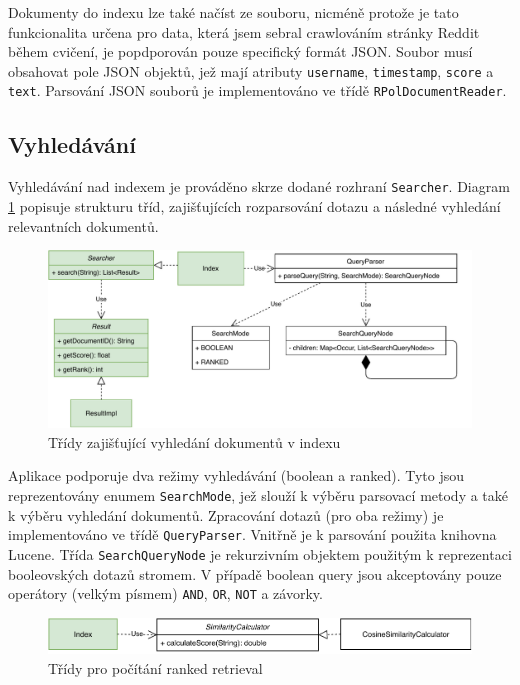 \documentclass[11pt,a4paper]{scrartcl}
\begin{document}
	Dokumenty do indexu lze také načíst ze souboru, nicméně protože je tato funkcionalita určena pro data, která jsem sebral crawlováním stránky Reddit během cvičení, je popdporován pouze specifický formát JSON. Soubor musí obsahovat pole JSON objektů, jež mají atributy \verb|username|, \verb|timestamp|, \verb|score| a \verb|text|. Parsování JSON souborů je implementováno ve třídě \verb|RPolDocumentReader|.
	
	\subsection{Vyhledávání}
	
	Vyhledávání nad indexem je prováděno skrze dodané rozhraní \verb|Searcher|. Diagram \ref{fig:search-uml} popisuje strukturu tříd, zajišťujících rozparsování dotazu a následné vyhledání relevantních dokumentů.
	
	\begin{figure}[!h]
		\centering
		\includegraphics[width=\linewidth]{search-uml}
		\caption{Třídy zajišťující vyhledání dokumentů v indexu}
		\label{fig:search-uml}
	\end{figure} 
	
	Aplikace podporuje dva režimy vyhledávání (boolean a ranked). Tyto jsou reprezentovány enumem \verb|SearchMode|, jež slouží k výběru parsovací metody a také k výběru vyhledání dokumentů. Zpracování dotazů (pro oba režimy) je implementováno ve třídě \verb|QueryParser|. Vnitřně je k parsování použita knihovna Lucene. Třída \verb|SearchQueryNode| je rekurzivním objektem použitým k reprezentaci booleovských dotazů stromem. V případě boolean query jsou akceptovány pouze operátory (velkým písmem) \verb|AND|, \verb|OR|, \verb|NOT| a závorky.
	
	\begin{figure}[!h]
		\centering
		\includegraphics[width=\linewidth]{cosine-uml}
		\caption{Třídy pro počítání ranked retrieval}
		\label{fig:cosine-uml}
	\end{figure} 
	
\end{document}
